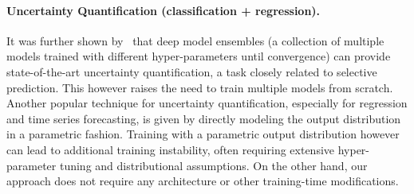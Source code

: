 
\paragraph{Uncertainty Quantification (classification + regression).} 
It was further shown by~\citep{balaji2017uncertainty, zaoui2020regression} that deep model ensembles (\ie a collection of multiple models trained with different hyper-parameters until convergence) can provide state-of-the-art uncertainty quantification, a task closely related to selective prediction. This however raises the need to train multiple models from scratch. %
Another popular technique for uncertainty quantification, especially for regression and time series forecasting, is given by directly modeling the output distribution~\citep{alexandrov2019gluonts} in a parametric fashion. Training with a parametric output distribution however can lead to additional training instability, often requiring extensive hyper-parameter tuning and distributional assumptions. On the other hand, our approach does not require any architecture or other training-time modifications. 


